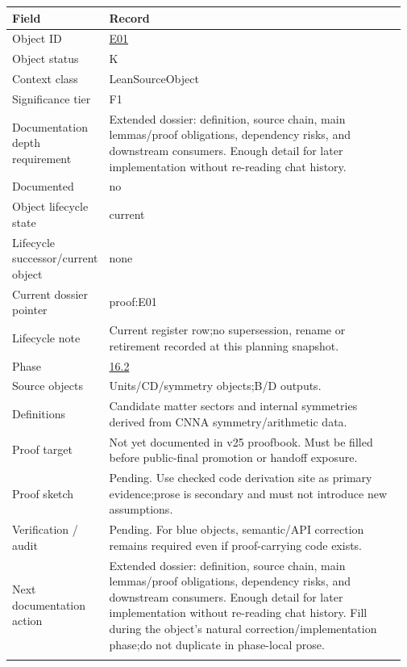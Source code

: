 \begin{longtable}{L{0.16\linewidth} L{0.81\linewidth}}
\hline
\textbf{Field} & \textbf{Record}\\
\hline
Object ID & \hyperlink{object-row-E01}{E01}\\
\hline\addlinespace[0.20em]
Object status & K\\
\hline\addlinespace[0.20em]
Context class & LeanSourceObject\\
\hline\addlinespace[0.20em]
Significance tier & F1\\
\hline\addlinespace[0.20em]
Documentation depth requirement & Extended dossier: definition, source chain, main lemmas/\allowbreak{}proof obligations, dependency risks, and downstream consumers. Enough detail for later implementation without re-reading chat history.\\
\hline\addlinespace[0.20em]
Documented & no\\
\hline\addlinespace[0.20em]
Object lifecycle state & current\\
\hline\addlinespace[0.20em]
Lifecycle successor/\allowbreak{}current object & none\\
\hline\addlinespace[0.20em]
Current dossier pointer & proof:E01\\
\hline\addlinespace[0.20em]
Lifecycle note & Current register row;\newline no supersession, rename or retirement recorded at this planning snapshot.\\
\hline\addlinespace[0.20em]
Phase & \hyperlink{phase-row-16-2}{16.2}\\
\hline\addlinespace[0.20em]
Source objects & Units/\allowbreak{}CD/\allowbreak{}symmetry objects;\newline B/\allowbreak{}D outputs.\\
\hline\addlinespace[0.20em]
Definitions & Candidate matter sectors and internal symmetries derived from CNNA symmetry/\allowbreak{}arithmetic data.\\
\hline\addlinespace[0.20em]
Proof target & Not yet documented in v25 proofbook. Must be filled before public-final promotion or handoff exposure.\\
\hline\addlinespace[0.20em]
Proof sketch & Pending. Use checked code derivation site as primary evidence;\newline prose is secondary and must not introduce new assumptions.\\
\hline\addlinespace[0.20em]
Verification /\allowbreak{} audit & Pending. For blue objects, semantic/\allowbreak{}API correction remains required even if proof-carrying code exists.\\
\hline\addlinespace[0.20em]
Next documentation action & Extended dossier: definition, source chain, main lemmas/\allowbreak{}proof obligations, dependency risks, and downstream consumers. Enough detail for later implementation without re-reading chat history. Fill during the object's natural correction/\allowbreak{}implementation phase;\newline do not duplicate in phase-local prose.\\
\hline\addlinespace[0.20em]
\end{longtable}
